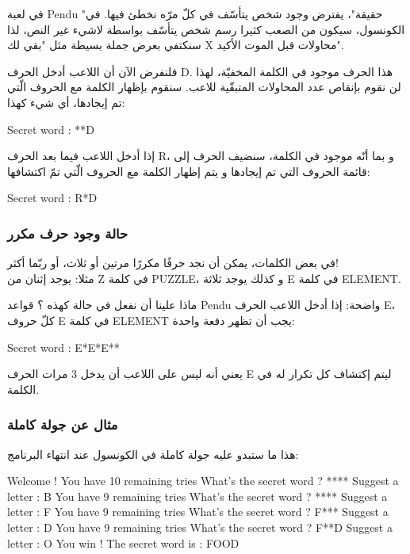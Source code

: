\begin{information}
في لعبة
\textenglish{Pendu}
"حقيقة"، يفترض وجود شخص يتأسّف في كلّ مرّه نخطئ فيها. في الكونسول، سيكون من الصعب كثيرا رسم شخص يتأسّف بواسطة لاشيء غير النص،  لذا سنكتفي بعرض جملة بسيطة مثل "بقي لك
\textenglish{X}
محاولات قبل الموت الأكيد".
\end{information}

فلنفرض الآن أن اللاعب أدخل الحرف
\textenglish{D}.
هذا الحرف موجود في الكلمة المخفيّة، لهذا لن نقوم بإنقاص عدد المحاولات المتبقّية للاعب. سنقوم بإظهار الكلمة مع الحروف الّتي تم إيجادها، أي شيء كهذا:

\begin{Console}
Secret word : **D
\end{Console}

إذا أدخل اللاعب فيما بعد الحرف
\textenglish{R}،
و بما أنّه موجود في الكلمة، سنضيف الحرف إلى قائمة الحروف التي تم إيجادها و يتم إظهار الكلمة مع الحروف الّتي تمّ اكتشافها:

\begin{Console}
Secret word : R*D
\end{Console}

\subsubsection{حالة وجود حرف مكرر}

في بعض الكلمات، يمكن أن نجد حرفًا مكررًا مرتين أو ثلاث، أو ربّما أكثر!\\
مثلا: يوجد إثنان من
\textenglish{Z}
في كلمة
\textenglish{PUZZLE}،
و كذلك يوجد ثلاثة
\textenglish{E}
في كلمة
\textenglish{ELEMENT}.

ماذا علينا أن نفعل في حالة كهذه ؟ قواعد
\textenglish{Pendu}
واضحة: إذا أدخل اللاعب الحرف
\textenglish{E}،
كلّ حروف
\textenglish{E}
في كلمة
\textenglish{ELEMENT}
يجب أن تظهر دفعة واحدة:

\begin{Console}
Secret word : E*E*E**
\end{Console}

يعني أنه ليس على اللاعب أن يدخل 3 مرات الحرف
\textenglish{E}
ليتم إكتشاف كل تكرار له في الكلمة.

\subsubsection{مثال عن جولة كاملة}

هذا ما ستبدو عليه جولة كاملة في الكونسول عند انتهاء البرنامج:

\begin{Console}
Welcome !
You have 10 remaining tries
What's the secret word ? ****
Suggest a letter : B
You have 9 remaining tries
What's the secret word ? ****
Suggest a letter : F
You have 9 remaining tries
What's the secret word ? F***
Suggest a letter : D
You have 9 remaining tries
What's the secret word ? F**D
Suggest a letter : O
You win ! The secret word is  : FOOD
\end{Console}

